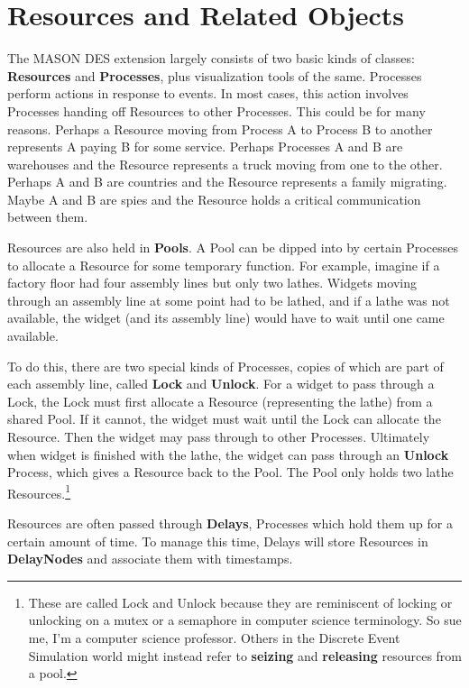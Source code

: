 \documentclass[twoside,10pt]{article}
\begin{document}
\section{Resources and Related Objects}

The MASON DES extension largely consists of two basic kinds of classes:  {\bf Resources} and {\bf Processes}, plus visualization tools of the same.   Processes perform actions in response to events.  In most cases, this action involves Processes handing off Resources to other Processes.  This could be for many reasons.  Perhaps a Resource moving from Process A to Process B to another represents A paying B for some service.  Perhaps Processes A and B are warehouses and the Resource represents a truck moving from one to the other.  Perhaps A and B are countries and the Resource represents a family migrating.  Maybe A and B are spies and the Resource holds a critical communication between them.

Resources are also held in {\bf Pools}.  A Pool can be dipped into by certain Processes to allocate a Resource for some temporary function.  For example, imagine if a factory floor had four assembly lines but only two lathes.  Widgets moving through an assembly line at some point had to be lathed, and if a lathe was not available, the widget (and its assembly line) would have to wait until one came available.

To do this, there are two special kinds of Processes, copies of which are part of each assembly line, called {\bf Lock} and {\bf Unlock}.  For a widget to pass through a Lock, the Lock must first allocate a Resource (representing the lathe) from a shared Pool.  If it cannot, the widget must wait until the Lock can allocate the Resource.  Then the widget may pass through to other Processes.  Ultimately when widget is finished with the lathe, the widget can pass through an {\bf Unlock} Process, which gives a Resource back to the Pool.   The Pool only holds two lathe Resources.\footnote{These are called Lock and Unlock because they are reminiscent of locking or unlocking on a mutex or a semaphore in computer science terminology.   So sue me, I'm a computer science professor. Others in the Discrete Event Simulation world might instead refer to {\bf seizing} and {\bf releasing} resources from a pool.}

Resources are often passed through {\bf Delays}, Processes which hold them up for a certain amount of time.  To manage this time, Delays will store Resources in {\bf DelayNodes} and associate them with timestamps. 
  
\end{document}
